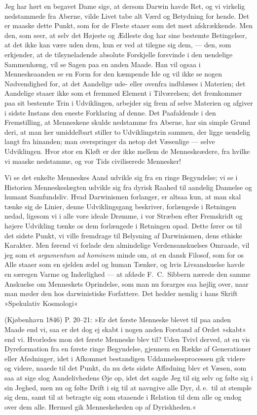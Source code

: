 \documentclass[12pt,a4paper]{article}
\begin{document}
Jeg har hørt en begavet Dame sige, at dersom Darwin havde Ret, og vi
virkelig nedstammede fra Aberne, vilde Livet tabe alt Værd og Betydning
for hende. Det er maaske dette Punkt, som for de Fleste staaer som det
mest afskrækkende. Men den, som seer, at selv det Højeste og Ædleste dog
har sine bestemte Betingelser, at det ikke kan være uden dem, kun er ved
at tilegne sig dem, --- den, som erkjender, at de tilsyneladende absolute
Forskjelle forsvinde i den uendelige Sammenhæng, vil se Sagen paa en
anden Maade. Han vil ogsaa i Menneskeaanden se en Form for den kæmpende
Ide og vil ikke se nogen Nødvendighed for, at det Aandelige ude- eller
ovenfra indblæses i Materien; det Aandelige staaer ikke som et fremmed
Element i Tilværelsen; det fremkommer paa sit bestemte Trin i
Udviklingen, arbejder sig frem af selve Materien og afgiver i sidste
Instans den eneste Forklaring af denne. Det Paafaldende i den
Fremstilling, at Menneskene skulde nedstamme fra Aberne, har sin simple
Grund deri, at man her umiddelbart stiller to Udviklingstrin sammen, der
ligge uendelig langt fra hinanden; man overspringer da netop det
Væsenlige --- selve Udviklingen. Hvor stor en Kløft er der ikke mellem
de Menneskeædere, fra hvilke vi maaske nedstamme, og vor Tids
civiliserede Mennesker!

Vi se det enkelte Menneskes Aand udvikle sig fra en ringe Begyndelse; vi
se i Historien Menneskeslægten udvikle sig fra dyrisk Raahed til aandelig
Dannelse og humant Samfundsliv. Hvad Darwinismen forlanger, er altsaa
kun, at man skal tænke sig de Linier, denne Udviklingsgang beskriver,
forlængede i Retningen nedad, ligesom vi i alle vore ideale Drømme, i
vor Stræben efter Fremskridt og højere Udvikling tænke os dem forlængede
i Retningen opad. Dette fører os til det sidste Punkt, vi ville fremdrage
til Belysning af Darwinismen, dens ethiske Karakter. Men førend vi
forlade den almindelige Verdensanskuelses Omraade, vil jeg som et
\textit{argumentum ad hominem} minde om, at en dansk Filosof, som for os
Alle staaer som en sjelden ædel og human Tænker, og hvis Livsanskuelse
havde en særegen Varme og Inderlighed --- at afdøde F.\ C.\ Sibbern
nærede den samme Anskuelse om Menneskets Oprindelse, som man nu forarges
saa højlig over, naar man møder den hos darwinistiske Forfattere. Det
hedder nemlig i hans Skrift »Spekulativ Kosmologi«

(Kjøbenhavn 1846) P. 20--21: »Er det første Menneske
blevet til paa anden Maade end vi, saa er det dog ej
skabt i nogen anden Forstand af Ordet »skabt« end vi.
Hvorledes mon det første Menneske blev til? Uden Tvivl
derved, at en vis Dyreformation fra en første ringe
Begyndelse, gjennem en Række af Generationer eller
Afødninger, idet i Afkommet bestandigen Uddannelsesprocessen
gik videre og videre, naaede til det Punkt, da nu dets
sidste Affødning blev et Væsen, som saa at sige slog
Aandelivhedens Øje op, idet det sagde Jeg til sig selv
og følte sig i sin Jeghed, men nu og følte Drift i sig
til at navngive alle Dyr, d.\,e.\ til at stemple sig dem,
samt til at betragte sig som staaende i Relation til dem
alle og endog over dem alle. Hermed gik Menneskeheden
op af Dyriskheden.«
\end{document}
